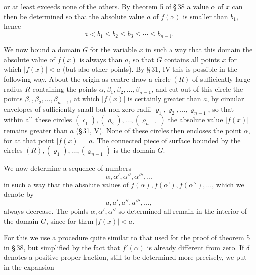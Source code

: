
or at least exceeds none of the others. By theorem 5 of \S\,38 a value $\alpha$ of $x$ can then be determined so that the absolute value $a$ of $f(\alpha)$ is smaller than $b_1$, hence
\begin{equation}
 a<b_1\le b_2\le b_3\le\cdots\le b_{n-1}.
\tag{5}
\end{equation}

We now bound a domain $G$ for the variable $x$ in such a way that  this domain the absolute value of $f(x)$ is always  than $a$, so that $G$ contains all points $x$ for which $|f(x)|<a$ (but also other points). By \S\,31, IV this is possible in the following way. About the origin as centre draw a circle $(R)$ of sufficiently large radius $R$ containing the points $\alpha,\beta_1,\beta_2,
\ldots,\beta_{n-1}$, and cut out of this circle the points $\beta_1,\beta_2,
\ldots,\beta_{n-1}$, at which $|f(x)|$ is certainly greater than $a$, by circular envelopes of sufficiently small but non-zero radii $\varrho_1,\varrho_2,
\ldots,\varrho_{n-1}$, so that within all these circles $(\varrho_1),(\varrho_2),\ldots,(\varrho_{n-1})$ the absolute value $|f(x)|$ remains greater than $a$ (\S\,31, V). None of these circles then encloses the point $\alpha$, for at that point $|f(x)|=a$. The connected piece of surface bounded by the circles $(R),(\varrho_1),\ldots,(\varrho_{n-1})$ is the domain $G$.


We now determine a sequence of numbers
\[
 \alpha,\alpha',\alpha'',\alpha''',\ldots
\]
in such a way that the absolute values of $f(\alpha),f(\alpha'),f(\alpha''),\ldots$, which we denote by
\[
 a,a',a'',a''',\ldots,
\]
always decrease. The points $\alpha,\alpha',\alpha''$ so determined all remain in the interior of the domain $G$, since for them $|f(x)|<a$.

For this we use a procedure quite similar to that used for the proof of theorem 5 in \S\,38, but simplified by the fact that $f'(\alpha)$ is already different from zero. If $\delta$ denotes a positive proper fraction, still to be determined more precisely, we put in the expansion
